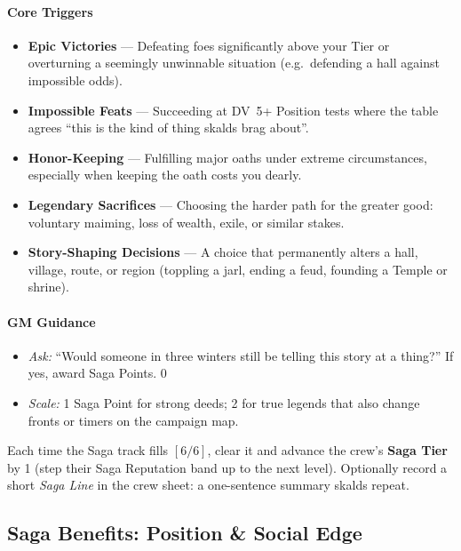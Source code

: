 \documentclass[11pt]{article}
\begin{document}
\paragraph*{Core Triggers}
\begin{itemize}
  \item \textbf{Epic Victories} --- Defeating foes significantly above your Tier or overturning a
        seemingly unwinnable situation (e.g.\ defending a hall against impossible odds).
  \item \textbf{Impossible Feats} --- Succeeding at DV~5+ Position tests where the table agrees
        ``this is the kind of thing skalds brag about''.
  \item \textbf{Honor-Keeping} --- Fulfilling major oaths under extreme circumstances, especially
        when keeping the oath costs you dearly.
  \item \textbf{Legendary Sacrifices} --- Choosing the harder path for the greater good:
        voluntary maiming, loss of wealth, exile, or similar stakes.
  \item \textbf{Story-Shaping Decisions} --- A choice that permanently alters a hall, village,
        route, or region (toppling a jarl, ending a feud, founding a Temple or shrine).
\end{itemize}

\paragraph*{GM Guidance}
\begin{itemize}
  \item \emph{Ask:} ``Would someone in three winters still be telling this story at a thing?'' If
        yes, award Saga Points.
  0 \item \emph{Scale:} 1 Saga Point for strong deeds; 2 for true legends that also change fronts
        or timers on the campaign map.
\end{itemize}

Each time the Saga track fills \([6/6]\), clear it and advance the crew's \textbf{Saga Tier} by 1
(step their Saga Reputation band up to the next level). Optionally record a short \emph{Saga
Line} in the crew sheet: a one-sentence summary skalds repeat.

\subsection{Saga Benefits: Position \& Social Edge}
\end{document}
